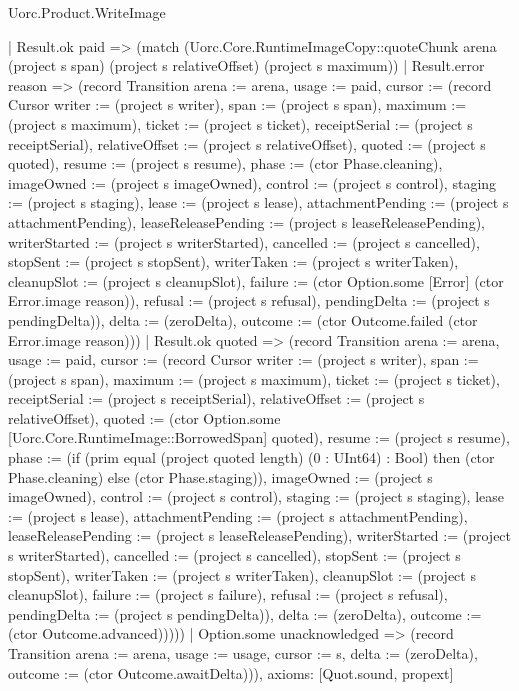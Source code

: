 \begin{lexlean}{Uorc.Product.WriteImage}
\begin{semanticmodule}
{        | Result.ok paid => (match (Uorc.Core.RuntimeImageCopy::quoteChunk arena (project s span) (project s relativeOffset) (project s maximum))
          | Result.error reason => (record Transition {arena := arena, usage := paid, cursor := (record Cursor {writer := (project s writer), span := (project s span), maximum := (project s maximum), ticket := (project s ticket), receiptSerial := (project s receiptSerial), relativeOffset := (project s relativeOffset), quoted := (project s quoted), resume := (project s resume), phase := (ctor Phase.cleaning), imageOwned := (project s imageOwned), control := (project s control), staging := (project s staging), lease := (project s lease), attachmentPending := (project s attachmentPending), leaseReleasePending := (project s leaseReleasePending), writerStarted := (project s writerStarted), cancelled := (project s cancelled), stopSent := (project s stopSent), writerTaken := (project s writerTaken), cleanupSlot := (project s cleanupSlot), failure := (ctor Option.some [Error] (ctor Error.image reason)), refusal := (project s refusal), pendingDelta := (project s pendingDelta)}), delta := (zeroDelta), outcome := (ctor Outcome.failed (ctor Error.image reason))})
          | Result.ok quoted => (record Transition {arena := arena, usage := paid, cursor := (record Cursor {writer := (project s writer), span := (project s span), maximum := (project s maximum), ticket := (project s ticket), receiptSerial := (project s receiptSerial), relativeOffset := (project s relativeOffset), quoted := (ctor Option.some [Uorc.Core.RuntimeImage::BorrowedSpan] quoted), resume := (project s resume), phase := (if (prim equal (project quoted length) (0 : UInt64) : Bool) then (ctor Phase.cleaning) else (ctor Phase.staging)), imageOwned := (project s imageOwned), control := (project s control), staging := (project s staging), lease := (project s lease), attachmentPending := (project s attachmentPending), leaseReleasePending := (project s leaseReleasePending), writerStarted := (project s writerStarted), cancelled := (project s cancelled), stopSent := (project s stopSent), writerTaken := (project s writerTaken), cleanupSlot := (project s cleanupSlot), failure := (project s failure), refusal := (project s refusal), pendingDelta := (project s pendingDelta)}), delta := (zeroDelta), outcome := (ctor Outcome.advanced)}))))
    | Option.some unacknowledged => (record Transition {arena := arena, usage := usage, cursor := s, delta := (zeroDelta), outcome := (ctor Outcome.awaitDelta)})),
  axioms: [Quot.sound, propext]
}


\end{semanticmodule}
\end{lexlean}

